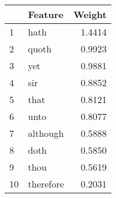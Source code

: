 \begin{tabular}{llr}
\toprule
{} &    Feature &  Weight \\
\midrule
1  &       hath &  1.4414 \\
2  &      quoth &  0.9923 \\
3  &        yet &  0.9881 \\
4  &        sir &  0.8852 \\
5  &       that &  0.8121 \\
6  &       unto &  0.8077 \\
7  &   although &  0.5888 \\
8  &       doth &  0.5850 \\
9  &       thou &  0.5619 \\
10 &  therefore &  0.2031 \\
\bottomrule
\end{tabular}
